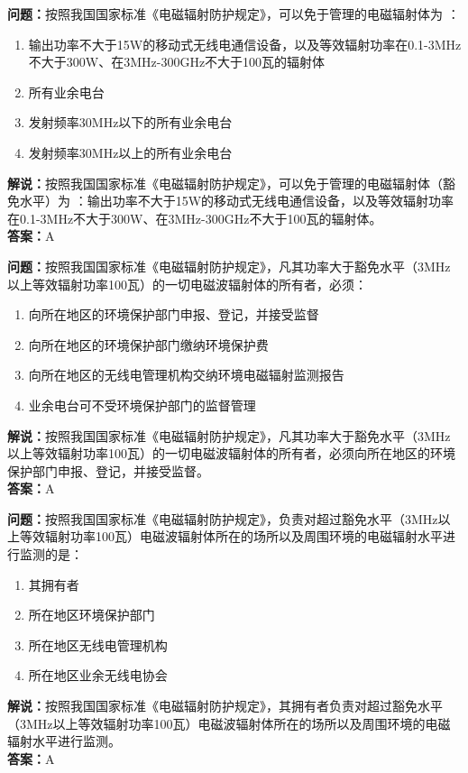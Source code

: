 \textbf{问题：}按照我国国家标准《电磁辐射防护规定》，可以免于管理的电磁辐射体为 ：
\begin{enumerate}[label=\Alph*), leftmargin=1cm]
	\item 输出功率不大于15W的移动式无线电通信设备，以及等效辐射功率在0.1-3MHz不大于300W、在3MHz-300GHz不大于100瓦的辐射体
	\item 所有业余电台
	\item 发射频率30MHz以下的所有业余电台
	\item 发射频率30MHz以上的所有业余电台
\end{enumerate}
\textbf{解说：}按照我国国家标准《电磁辐射防护规定》，可以免于管理的电磁辐射体（豁免水平）为 ：输出功率不大于15W的移动式无线电通信设备，以及等效辐射功率在0.1-3MHz不大于300W、在3MHz-300GHz不大于100瓦的辐射体。\\
\textbf{答案：}A

\textbf{问题：}按照我国国家标准《电磁辐射防护规定》，凡其功率大于豁免水平（3MHz以上等效辐射功率100瓦）的一切电磁波辐射体的所有者，必须：
\begin{enumerate}[label=\Alph*), leftmargin=1cm]
	\item 向所在地区的环境保护部门申报、登记，并接受监督
	\item 向所在地区的环境保护部门缴纳环境保护费
	\item 向所在地区的无线电管理机构交纳环境电磁辐射监测报告
	\item 业余电台可不受环境保护部门的监督管理
\end{enumerate}
\textbf{解说：}按照我国国家标准《电磁辐射防护规定》，凡其功率大于豁免水平（3MHz以上等效辐射功率100瓦）的一切电磁波辐射体的所有者，必须向所在地区的环境保护部门申报、登记，并接受监督。\\
\textbf{答案：}A

\textbf{问题：}按照我国国家标准《电磁辐射防护规定》，负责对超过豁免水平（3MHz以上等效辐射功率100瓦）电磁波辐射体所在的场所以及周围环境的电磁辐射水平进行监测的是：
\begin{enumerate}[label=\Alph*), leftmargin=1cm]
	\item 其拥有者
	\item 所在地区环境保护部门
	\item 所在地区无线电管理机构
	\item 所在地区业余无线电协会
\end{enumerate}
\textbf{解说：}按照我国国家标准《电磁辐射防护规定》，其拥有者负责对超过豁免水平（3MHz以上等效辐射功率100瓦）电磁波辐射体所在的场所以及周围环境的电磁辐射水平进行监测。\\
\textbf{答案：}A

